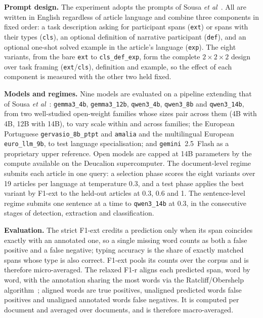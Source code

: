 \documentclass[extendedabs]{recpad2k}
\newcommand{\ubk}{\_\allowbreak}
\def\etal{\emph{et al}\bmvaOneDot}
\begin{document}
\noindent\textbf{Prompt design.} The experiment adopts the prompts of Sousa \etal~\cite{Sousaetal2023}. All are written in English regardless of article language and combine three components in fixed order: a task description asking for participant spans (\texttt{ext}) or spans with their types (\texttt{cls}), an optional definition of narrative participant (\texttt{def}), and an optional one-shot solved example in the article's language (\texttt{exp}). The eight variants, from the bare \texttt{ext} to \texttt{cls\ubk{}def\ubk{}exp}, form the complete $2\times2\times2$ design over task framing (\texttt{ext}/\texttt{cls}), definition and example, so the effect of each component is measured with the other two held fixed.

\noindent\textbf{Models and regimes.} Nine models are evaluated on a pipeline extending that of Sousa \etal~\cite{Sousaetal2023}: \texttt{gemma3\ubk{}4b}, \texttt{gemma3\ubk{}12b}, \texttt{qwen3\ubk{}4b}, \texttt{qwen3\ubk{}8b} and \texttt{qwen3\ubk{}14b}, from two well-studied open-weight families whose sizes pair across them (4B with 4B, 12B with 14B), to vary scale within and across families; the European Portuguese \texttt{gervasio\ubk{}8b\ubk{}ptpt} and \texttt{amalia} and the multilingual European \texttt{euro\ubk{}llm\ubk{}9b}, to test language specialisation; and \texttt{gemini}~2.5~Flash as a proprietary upper reference. Open models are capped at 14B parameters by the compute available on the Deucalion supercomputer. The document-level regime submits each article in one query: a selection phase scores the eight variants over 19 articles per language at temperature 0.3, and a test phase applies the best variant by F1-ext to the held-out articles at 0.3, 0.6 and 1. The sentence-level regime submits one sentence at a time to \texttt{qwen3\ubk{}14b} at 0.3, in the consecutive stages of detection, extraction and classification.

\noindent\textbf{Evaluation.} The strict F1-ext credits a prediction only when its span coincides exactly with an annotated one, so a single missing word counts as both a false positive and a false negative; typing accuracy is the share of exactly matched spans whose type is also correct. F1-ext pools its counts over the corpus and is therefore micro-averaged. The relaxed F1-r aligns each predicted span, word by word, with the annotation sharing the most words via the Ratcliff/Obershelp algorithm~\cite{ratcliff1988pattern}; aligned words are true positives, unaligned predicted words false positives and unaligned annotated words false negatives. It is computed per document and averaged over documents, and is therefore macro-averaged.
\end{document}
